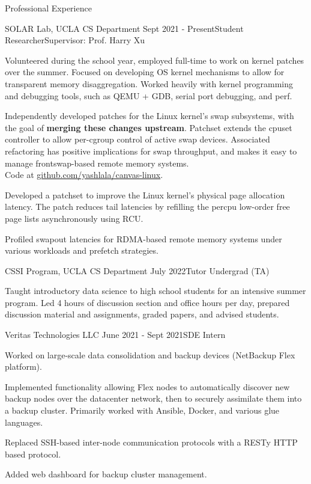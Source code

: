 \documentclass{resume} %
\begin{document}
\begin{resumeSection}{Professional Experience} \itemsep -12pt

\begin{resumeSubsection}{SOLAR Lab, UCLA CS Department} 
	{Sept 2021 - Present}{Student Researcher}{Supervisor: Prof. Harry Xu}
\item Volunteered during the school year, employed full-time to work on kernel
	patches over the summer. Focused on developing OS kernel mechanisms to
	allow for transparent memory disaggregation. Worked heavily with kernel
	programming and debugging tools, such as QEMU + GDB, serial port
	debugging, and perf. 
\item Independently developed patches for the Linux kernel's swap subsystems,
	with the goal of \textbf{merging these changes upstream}. Patchset
	extends the cpuset controller to allow per-cgroup control of active
	swap devices. Associated refactoring has positive implications for swap
	throughput, and makes it easy to manage frontswap-based remote memory
	systems. \\
	Code at 
	\href{https://github.com/yashlala/canvas-linux}{github.com/yashlala/canvas-linux}.
\item Developed a patchset to improve the Linux kernel's physical page
	allocation latency. The patch reduces tail latencies by refilling the
	percpu low-order free page lists asynchronously using RCU. 
\item Profiled swapout latencies for RDMA-based remote memory systems under
	various workloads and prefetch strategies. 
\end{resumeSubsection}

\begin{resumeSubsection}{CSSI Program, UCLA CS Department}
	{July 2022}{Tutor Undergrad (TA)}{}
\item Taught introductory data science to high school students for an intensive
	summer program. Led 4 hours of discussion section and office hours per
	day, prepared discussion material and assignments, graded papers, and
	advised students. 
\end{resumeSubsection}

\begin{resumeSubsection}{Veritas Technologies LLC}
	{June 2021 - Sept 2021}{SDE Intern}{}
\item Worked on large-scale data consolidation and backup devices (NetBackup
	Flex platform). 
\item Implemented functionality allowing Flex nodes to automatically discover
	new backup nodes over the datacenter network, then to securely
	assimilate them into a backup cluster. Primarily worked with
	Ansible, Docker, and various glue languages. 
\item Replaced SSH-based inter-node communication protocols with a RESTy HTTP
	based protocol. 
\item Added web dashboard for backup cluster management. 
\end{resumeSubsection}


\end{resumeSection}
\end{document}
